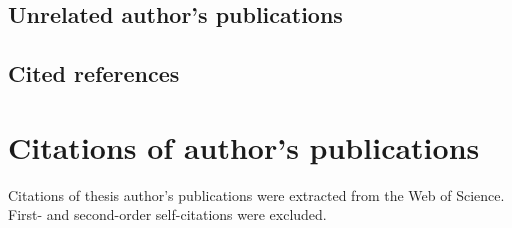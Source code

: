 \documentclass[a4paper,11pt,titlepage,twoside]{book}
\newcommand{\chapternoclear}[1]{
  \begingroup
  \let\cleardoublepage\clearpage
  \chapter{#1}
  \endgroup
}
\begin{document}


\section{Unrelated author's publications}

\printbibliography[keyword={mine},notkeyword={phd_unrelated},notkeyword={phd_related},heading=none,title={}]



\section{Cited references}
\printbibliography[notkeyword=mine,heading=none,title={}]





\appendix
\renewcommand\chaptername{Citations of author's publications}

\chapternoclear{Citations of author's publications}

Citations of thesis author's publications were extracted from the Web of Science.
First- and second-order self-citations were excluded.

\DeclareCiteCommand{\fullcite}
{}
{%
  \usedriver
  {%
  }
{}}
{\multicitedelim}
{}

\noindent
{}
\begin{refsection}
  \nocite{*}
  \printbibliography[heading=none,title={},env=favoritebib]
\end{refsection}


\end{document}
